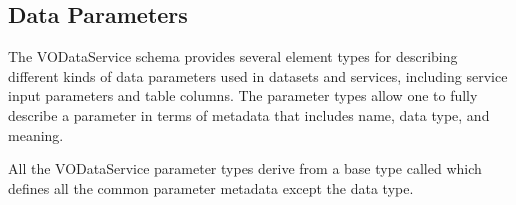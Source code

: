 \documentclass[11pt,a4paper]{ivoa}
\begin{document}
\subsection{Data Parameters}
\label{sect:param}


The VODataService schema provides several element types for describing
different kinds of data parameters used in datasets and services,
including service input parameters and table columns.  The parameter
types allow one to fully describe a parameter in terms of metadata
that includes name, data type, and meaning.  


All the VODataService parameter types derive from a base type called
 which defines all the common parameter
metadata except the data type.  


\end{document}
